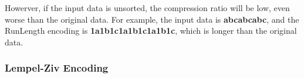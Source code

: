 \documentclass[sigconf]{acmart}
\begin{document}
    Howerver, if the input data is unsorted, the compression ratio will be low, even worse than the original data. For example, the input data is \textbf{abcabcabc}, and the RunLength encoding is \textbf{1a1b1c1a1b1c1a1b1c}, which is longer than the original data.

\subsubsection*{Lempel-Ziv Encoding}


    








\end{document}
